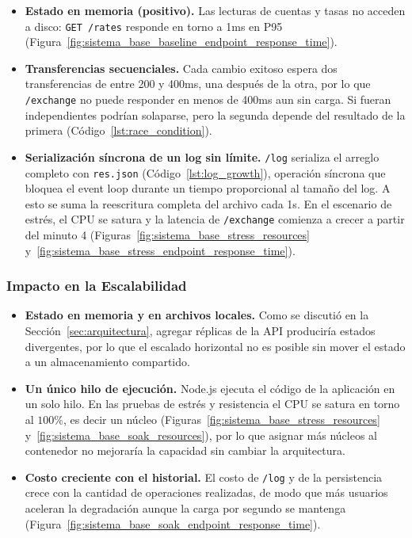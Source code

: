         \begin{itemize}
            \item \textbf{Estado en memoria (positivo).} Las lecturas de cuentas y tasas no
            acceden a disco: \texttt{GET /rates} responde en torno a 1ms en P95
            (Figura~\ref{fig:sistema_base_baseline_endpoint_response_time}).
            \item \textbf{Transferencias secuenciales.} Cada cambio exitoso espera dos
            transferencias de entre 200 y 400ms, una después de la otra, por lo que
            \texttt{/exchange} no puede responder en menos de 400ms aun sin carga. Si
            fueran independientes podrían solaparse, pero la segunda depende del resultado
            de la primera (Código~\ref{lst:race_condition}).
            \item \textbf{Serialización síncrona de un log sin límite.} \texttt{/log}
            serializa el arreglo completo con \texttt{res.json} (Código~\ref{lst:log_growth}), operación síncrona que
            bloquea el event loop durante un tiempo proporcional al tamaño del log. A esto
            se suma la reescritura completa del archivo cada 1s. En el escenario de
            estrés, el CPU se satura y la latencia de \texttt{/exchange} comienza a crecer
            a partir del minuto 4
            (Figuras~\ref{fig:sistema_base_stress_resources} y~\ref{fig:sistema_base_stress_endpoint_response_time}).
        \end{itemize}

        \subsubsection{Impacto en la Escalabilidad}
        \label{sec:impacto_en_la_escalabilidad}

        \begin{itemize}
            \item \textbf{Estado en memoria y en archivos locales.} Como se discutió en la
            Sección~\ref{sec:arquitectura}, agregar réplicas de la API produciría estados
            divergentes, por lo que el escalado horizontal no es posible sin mover el
            estado a un almacenamiento compartido.
            \item \textbf{Un único hilo de ejecución.} Node.js ejecuta el código de la
            aplicación en un solo hilo. En las pruebas de estrés y resistencia el CPU se
            satura en torno al $100\%$, es decir un núcleo
            (Figuras~\ref{fig:sistema_base_stress_resources} y~\ref{fig:sistema_base_soak_resources}),
            por lo que asignar más núcleos al contenedor no mejoraría la capacidad sin
            cambiar la arquitectura.
            \item \textbf{Costo creciente con el historial.} El costo de \texttt{/log} y de
            la persistencia crece con la cantidad de operaciones realizadas, de modo que
            más usuarios aceleran la degradación aunque la carga por segundo se mantenga (Figura~\ref{fig:sistema_base_soak_endpoint_response_time}).
        \end{itemize}

